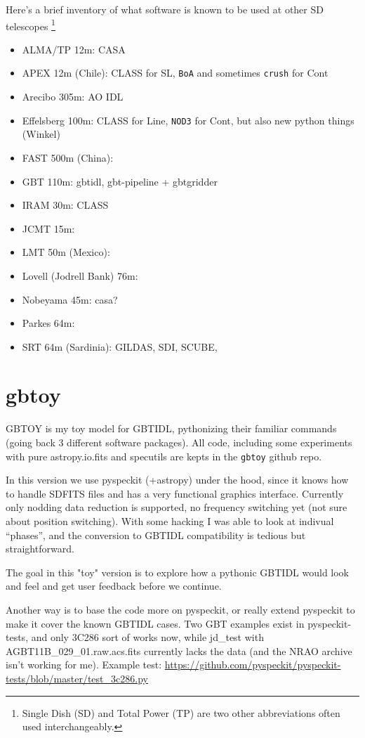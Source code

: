 \documentclass[12pt,a4paper]{article}
\begin{document}
Here's a brief inventory of what software is known to be used at other SD telescopes
\footnote{Single Dish (SD) and Total Power (TP) are two other abbreviations often
  used interchangeably.}

\begin{itemize}
  \item ALMA/TP 12m: CASA
  \item APEX 12m (Chile): CLASS for SL, {\tt BoA} and sometimes {\tt crush} for Cont
  \item Arecibo 305m: AO IDL
  \item Effelsberg 100m:  CLASS for Line, {\tt NOD3} for Cont, but also new python things (Winkel)
  \item FAST 500m (China):
  \item GBT 110m:  gbtidl, gbt-pipeline + gbtgridder
  \item IRAM 30m: CLASS
  \item JCMT 15m:
  \item LMT 50m (Mexico):
  \item Lovell (Jodrell Bank) 76m:
  \item Nobeyama 45m:   casa?
  \item Parkes 64m:
  \item SRT 64m (Sardinia): GILDAS, SDI, SCUBE, 
\end{itemize}       
       

\section{gbtoy}       

GBTOY is my toy model for GBTIDL, pythonizing their familiar commands
(going back 3 different software packages). All code, including
some experiments with pure astropy.io.fits and specutils are kepts
in the {\tt gbtoy} github repo.

In this version we use pyspeckit (+astropy) under the hood, since it
knows how to handle SDFITS files and has a very functional graphics
interface. Currently only nodding data reduction is supported,
no frequency switching yet (not sure about position switching). With
some hacking I was able to look at indivual ``phases'', and the
conversion to GBTIDL compatibility is tedious but straightforward.

The goal in this "toy" version is to explore how a pythonic GBTIDL would
look and feel and get user feedback before we continue.

Another way is to base the code more on pyspeckit, or really extend
pyspeckit to make it cover the known GBTIDL cases.  Two GBT examples
exist in pyspeckit-tests, and only 3C286 sort of works now, while
jd\_test with AGBT11B\_029\_01.raw.acs.fits currently lacks the data
(and the NRAO archive isn't working for me).
Example test:  \url{https://github.com/pyspeckit/pyspeckit-tests/blob/master/test_3c286.py}
\end{document}
